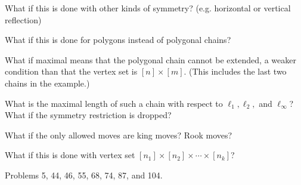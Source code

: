 \documentclass{article}
\begin{document}
\begin{related}
  \item What if this is done with other kinds of symmetry?
  (e.g. horizontal or vertical reflection)
  \item What if this is done for polygons instead of polygonal chains?
  \item What if maximal means that the polygonal chain cannot be extended, a
  weaker condition than that the vertex set is $[n] \times [m]$.
  (This includes the last two chains in the example.)
  \item What is the maximal length of such a chain with respect to
    $\ell_1, \ell_2,$ and $\ell_\infty$?
    What if the symmetry restriction is dropped?
  \item What if the only allowed moves are king moves? Rook moves?
  \item What if this is done with vertex set
    $[n_1] \times [n_2] \times \cdots \times [n_k]$?
\end{related}

\begin{references}
  \item Problems 5, 44, 46, 55, 68, 74, 87, and 104.
\end{references}
\end{document}
